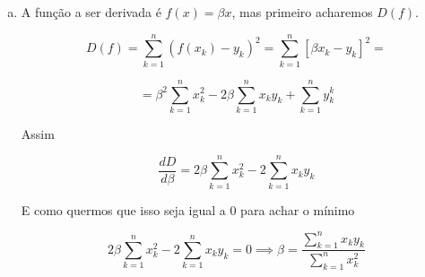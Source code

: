 \documentclass[11pt]{article}
\begin{document}
\begin{exerc}
\begin{enumerate}[a.]
\item
A função a ser derivada é $f(x) = \beta x$, mas primeiro acharemos $D(f)$.

$$D(f) = \sum_{k=1}^{n}(f(x_k) - y_k)^2 = \sum_{k=1}^{n}[\beta x_k - y_k]^2 = $$

$$ = \beta^2 \sum_{k=1}^{n}x_k^2 - 2\beta \sum_{k=1}^{n}x_k y_k + \sum_{k=1}^{n} y_k^k$$

Assim

$$\frac{dD}{d\beta} = 2\beta \sum_{k=1}^{n}x_k^2 - 2 \sum_{k=1}^{n}x_k y_k$$

E como quermos que isso seja igual a 0 para achar o mínimo

$$2\beta \sum_{k=1}^{n}x_k^2 - 2 \sum_{k=1}^{n}x_k y_k = 0 \implies \beta = \frac{\sum_{k=1}^{n}x_k y_k}{\sum_{k=1}^{n}x_k^2}$$

\end{enumerate}
\end{exerc}

\newpage
\end{document}
